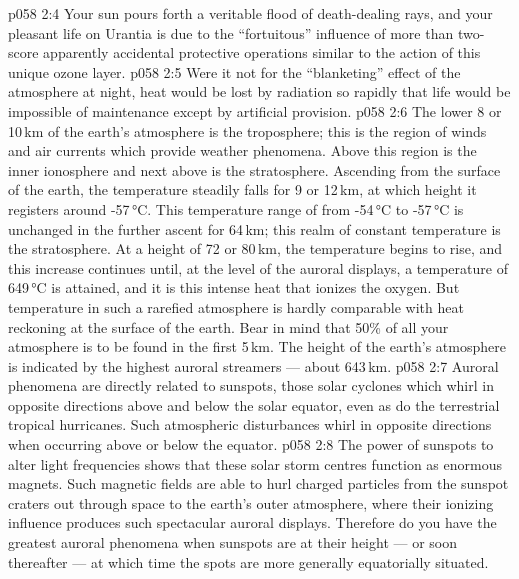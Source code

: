 \vs p058 2:4 Your sun pours forth a veritable flood of death\hyp{}dealing rays, and your pleasant life on Urantia is due to the “fortuitous” influence of more than two\hyp{}score apparently accidental protective operations similar to the action of this unique ozone layer.
\vs p058 2:5 Were it not for the “blanketing” effect of the atmosphere at night, heat would be lost by radiation so rapidly that life would be impossible of maintenance except by artificial provision.
\vs p058 2:6 \pc The lower 8 or 10\,km of the earth’s atmosphere is the troposphere; this is the region of winds and air currents which provide weather phenomena. Above this region is the inner ionosphere and next above is the stratosphere. Ascending from the surface of the earth, the temperature steadily falls for 9 or 12\,km, at which height it registers around -57\,°C. This temperature range of from -54\,°C to -57\,°C is unchanged in the further ascent for 64\,km; this realm of constant temperature is the stratosphere. At a height of 72 or 80\,km, the temperature begins to rise, and this increase continues until, at the level of the auroral displays, a temperature of 649\,°C is attained, and it is this intense heat that ionizes the oxygen. But temperature in such a rarefied atmosphere is hardly comparable with heat reckoning at the surface of the earth. Bear in mind that 50\% of all your atmosphere is to be found in the first 5\,km. The height of the earth’s atmosphere is indicated by the highest auroral streamers --- about 643\,km.
\vs p058 2:7 Auroral phenomena are directly related to sunspots, those solar cyclones which whirl in opposite directions above and below the solar equator, even as do the terrestrial tropical hurricanes. Such atmospheric disturbances whirl in opposite directions when occurring above or below the equator.
\vs p058 2:8 The power of sunspots to alter light frequencies shows that these solar storm centres function as enormous magnets. Such magnetic fields are able to hurl charged particles from the sunspot craters out through space to the earth’s outer atmosphere, where their ionizing influence produces such spectacular auroral displays. Therefore do you have the greatest auroral phenomena when sunspots are at their height --- or soon thereafter --- at which time the spots are more generally equatorially situated.
